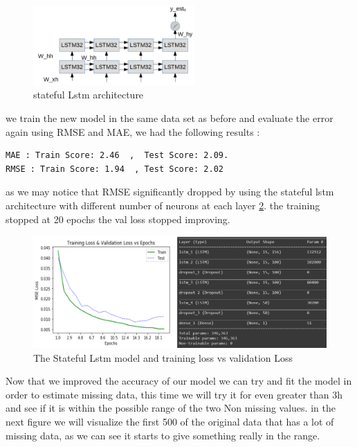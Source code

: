 \begin{figure}[h]
\centering
\includegraphics[width=0.55\textwidth]{img/stateful_stacked_lstm.png}  
\caption{stateful Lstm  architecture \cite{keras2015}}
\label{}
\end{figure}
we train the new model in the same data set as before and evaluate the error again using RMSE and MAE, we had the following results :
\begin{verbatim}
MAE : Train Score: 2.46  ,  Test Score: 2.09.
RMSE : Train Score: 1.94  , Test Score: 2.02 
\end{verbatim}
as we may notice that RMSE significantly dropped by using the stateful lstm architecture with different  number of neurons at each layer \ref{stat_lstm}. the training stopped at 20 epochs the val loss stopped improving.
\begin{figure}[!h]
\centering
\includegraphics[width=1.06\textwidth]{img/lstm_stateful.png}  
\caption{The Stateful Lstm model and training loss vs validation Loss }
\label{stat_lstm}
\end{figure}
Now that we improved the accuracy of our model we can try and fit the model in order to estimate missing data, this time we will try it for even greater than 3h and see if it is within the possible range of the two Non missing values.
in the next figure we will visualize the first 500 of the original data that has a lot of missing data, as we can see it starts to give something really in the range.

